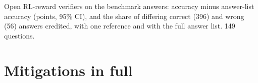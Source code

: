 \begin{table}[htbp]
\centering
\caption{Open RL-reward verifiers on the benchmark answers: accuracy minus answer-list accuracy (points, 95\% CI), and the share of differing correct (396) and wrong (56) answers credited, with one reference and with the full answer list. 149 questions.\pre}
\label{tab:r26-verifiers}
\footnotesize
\setlength{\tabcolsep}{3pt}
\begin{adjustbox}{max width=\linewidth}\end{adjustbox}
\end{table}

\FloatBarrier
\section{Mitigations in full}
\label{app:mitigation}

